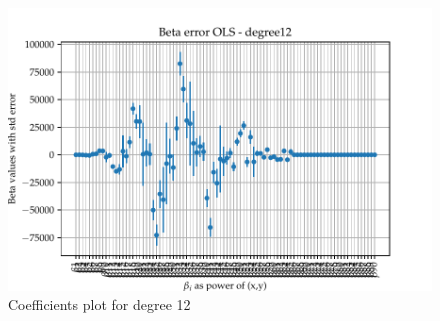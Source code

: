 \documentclass[11pt, a4paper]{article}
\begin{document}
\begin{figure}
  \centering
  \hspace*{-4.2cm}  
  \includegraphics[scale=0.52]{figures/EX6_EX1_OLS_beta_error_degree12.pdf}
  \caption{Coefficients plot for degree 12}
  \label{fig:EX6_1_OLS_betas_plot_degree12}
\end{figure}
\end{document}
